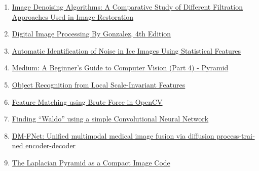 \documentclass[a4paper,12pt]{article}
\begin{document}
\begin{LTR}
	\begin{latin}
		\begin{enumerate}[left=0pt,labelsep=5pt,itemsep=0pt,parsep=0pt,topsep=0pt]
			\item \href{https://ieeexplore.ieee.org/abstract/document/6524379/}{Image Denoising Algorithms: A Comparative Study of Different Filtration Approaches Used in Image Restoration}
			\item \href{https://elibrary.pearson.de/book/99.150005/9781292223070}{Digital Image Processing By Gonzalez, 4th Edition}
			\item \href{https://www.researchgate.net/figure/Simple-pattern-classifier-to-identify-noise-types-of-Gaussian-Speckle-and-Salt-Pepper_tbl1_258714501}{Automatic Identification of Noise in Ice Images Using Statistical Features}
			\item \href{https://medium.com/analytics-vidhya/a-beginners-guide-to-computer-vision-part-4-pyramid-3640edeffb00}{Medium: A Beginner's Guide to Computer Vision (Part 4) - Pyramid}
					\item \href{https://www.cs.ubc.ca/~lowe/papers/iccv99.pdf}{Object Recognition from Local Scale-Invariant Features}
					\item \href{https://www.geeksforgeeks.org/machine-learning/feature-matching-using-brute-force-in-opencv/}{Feature Matching using Brute Force in OpenCV}
					\item \href{https://medium.com/analytics-vidhya/finding-waldo-using-a-simple-convolutional-neural-network-1604cb4d2e55}{Finding “Waldo” using a simple Convolutional Neural Network}
					\item \href{https://arxiv.org/html/2506.15218v1}{DM-FNet: Unified multimodal medical image fusion via diffusion process-trained encoder-decoder}
							\item \href{https://ieeexplore.ieee.org/document/1095851}{The Laplacian Pyramid as a Compact Image Code}
		\end{enumerate}
	\end{latin}
\end{LTR}
\end{document}
